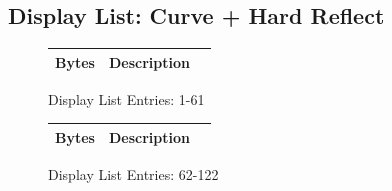 \subsection*{Display List: Curve + Hard Reflect}
\vspace{-0.5cm}
\begin{minipage}[b]{0.31\linewidth}
  \begin{figure}[H]
    {
      \setlength{\tabcolsep}{3.0pt}
      \setlength\cmidrulewidth{\heavyrulewidth} %
      \begin{adjustbox}{height=8.5cm}

        \begin{tabular}{lll}
          \toprule
          Bytes       & Description                                                         \\
          \midrule
          
        \end{tabular}

      \end{adjustbox}

    }\caption*{Display List Entries: 1-61}
  \end{figure}
\end{minipage}
\hspace{0.1cm}
\begin{minipage}[b]{0.31\linewidth}
  \begin{figure}[H]
    {
      \setlength{\tabcolsep}{3.0pt}
      \setlength\cmidrulewidth{\heavyrulewidth} %
      \begin{adjustbox}{height=8.5cm}

        \begin{tabular}{lll}
          \toprule
          Bytes       & Description                                                         \\
          \midrule
        \end{tabular}

      \end{adjustbox}

    }\caption*{Display List Entries: 62-122}
  \end{figure}
\end{minipage}
\hspace{0.1cm}
